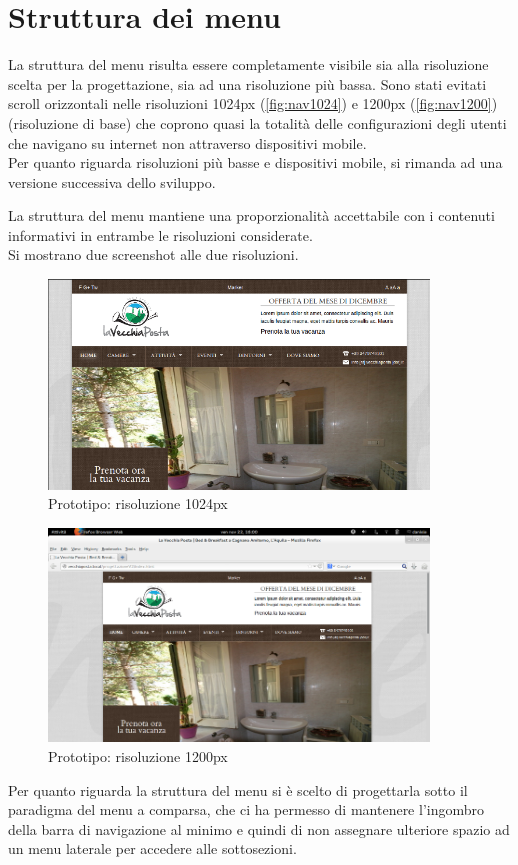 \documentclass[a4paper,12pt,hidelinks]{report}
\begin{document}
\section*{Struttura dei menu}
La struttura del menu risulta essere completamente visibile sia alla risoluzione scelta per la progettazione, sia ad una risoluzione più bassa.
Sono stati evitati scroll orizzontali nelle risoluzioni 1024px (\autoref{fig:nav1024}) e 1200px (\autoref{fig:nav1200}) (risoluzione di base) che coprono quasi la totalità 
delle configurazioni degli utenti che navigano su internet non attraverso dispositivi mobile.
\\Per quanto riguarda risoluzioni più basse e dispositivi mobile, si rimanda ad una versione successiva dello sviluppo.
\par La struttura del menu mantiene una proporzionalità accettabile con i contenuti informativi in entrambe le risoluzioni considerate. 
\\Si mostrano due screenshot alle due risoluzioni.
\begin{figure}[h!]%
    \includegraphics[width=0.9\textwidth,keepaspectratio=true]{../../img/nav1024}
    \centering
    \caption{Prototipo: risoluzione 1024px}%
    \label{fig:nav1024}%
\end{figure}

\begin{figure}[h!]%
    \includegraphics[width=0.9\textwidth,keepaspectratio=true]{../../img/nav1200}
    \centering
    \caption{Prototipo: risoluzione 1200px}%
    \label{fig:nav1200}%
\end{figure}
Per quanto riguarda la struttura del menu si è scelto di progettarla sotto il paradigma del menu a comparsa, che ci ha permesso di mantenere l'ingombro della barra di navigazione
al minimo e quindi di non assegnare ulteriore spazio ad un menu laterale per accedere alle sottosezioni.
\end{document}
